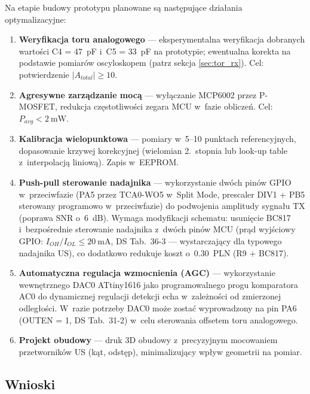 \documentclass[a4paper,11pt]{article}
\begin{document}
Na etapie budowy prototypu planowane są następujące działania optymalizacyjne:

\begin{enumerate}[nosep]
    \item \textbf{Weryfikacja toru analogowego} --- eksperymentalna weryfikacja
          dobranych wartości C4 = \SI{47}{\pico\farad} i~C5 = \SI{33}{\pico\farad}
          na prototypie; ewentualna korekta na podstawie pomiarów oscyloskopem
          (patrz sekcja \ref{sec:tor_rx}). Cel: potwierdzenie $|A_{total}| \geq 10$.
    \item \textbf{Agresywne zarządzanie mocą} --- wyłączanie MCP6002 przez
          P-MOSFET, redukcja częstotliwości zegara MCU w~fazie obliczeń.
          Cel: $P_{avg} < \SI{2}{\milli\watt}$.
    \item \textbf{Kalibracja wielopunktowa} --- pomiary w~5--10 punktach
          referencyjnych, dopasowanie krzywej korekcyjnej (wielomian 2.~stopnia
          lub look-up table z~interpolacją liniową). Zapis w~EEPROM.
    \item \textbf{Push-pull sterowanie nadajnika} --- wykorzystanie dwóch pinów
          GPIO w~przeciwfazie (PA5 przez TCA0-WO5 w~Split Mode, prescaler DIV1
          + PB5 sterowany
          programowo w~przeciwfazie) do podwojenia amplitudy sygnału TX
          (poprawa SNR o~\SI{6}{\deci\bel}). Wymaga modyfikacji schematu:
          usunięcie BC817 i~bezpośrednie sterowanie nadajnika z~dwóch pinów MCU
          (prąd wyjściowy GPIO: $I_{OH}/I_{OL} \leq \SI{20}{\milli\ampere}$,
          DS Tab.~36-3 --- wystarczający dla typowego nadajnika US), co dodatkowo
          redukuje koszt o~\SI{0,30}{PLN} (R9 + BC817).
    \item \textbf{Automatyczna regulacja wzmocnienia (AGC)} --- wykorzystanie
          wewnętrznego DAC0 ATtiny1616 jako programowalnego progu komparatora AC0
          do dynamicznej regulacji detekcji echa w~zależności od zmierzonej
          odległości. W~razie potrzeby DAC0 może zostać wyprowadzony na pin PA6
          (OUTEN = 1, DS Tab.~31-2) w~celu sterowania offsetem toru analogowego.
    \item \textbf{Projekt obudowy} --- druk 3D obudowy z~precyzyjnym mocowaniem
          przetworników US (kąt, odstęp), minimalizujący wpływ geometrii na pomiar.
\end{enumerate}

\subsection{Wnioski}
\end{document}
